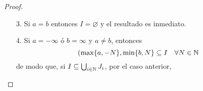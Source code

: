 \begin{proof}
\begin{enumerate}
\begin{enumerate}
			\item[3.] Si $a=b$ entonces $I = \varnothing$ y el resultado es inmediato.

			\item[4.] Si $a = -\infty$ ó $b = \infty$ y $a\neq b$, entonces
			\[ ( \max \{a,-N\}, \min \{b,N\} \subseteq I \quad \forall N \in \mathbb{N} \]
			de modo que, si $I \subseteq \bigcup_{i\in\mathbb{N}} J_i$, por el caso anterior,
		\end{enumerate}
	\end{enumerate}
\end{proof}

